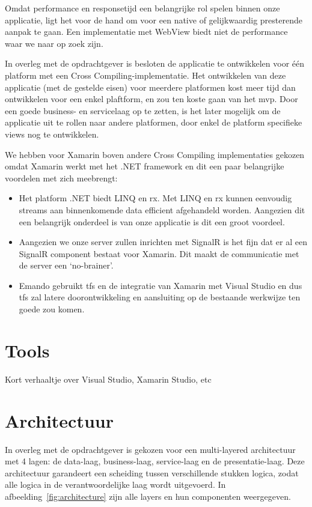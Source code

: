 Omdat performance en responsetijd een belangrijke rol spelen binnen onze applicatie, ligt het voor de hand om voor een native of gelijkwaardig presterende aanpak te gaan. Een implementatie met WebView biedt niet de performance waar we naar op zoek zijn.
    
In overleg met de opdrachtgever is besloten de applicatie te ontwikkelen voor \'e\'en platform met een Cross Compiling-implementatie. Het ontwikkelen van deze applicatie (met de gestelde eisen) voor meerdere platformen kost meer tijd dan ontwikkelen voor een enkel plaftform, en zou ten koste gaan van het \ac{mvp}. Door een goede business- en servicelaag op te zetten, is het later mogelijk om de applicatie uit te rollen naar andere platformen, door enkel de platform specifieke views nog te ontwikkelen.

We hebben voor Xamarin boven andere Cross Compiling implementaties gekozen omdat Xamarin werkt met het .NET framework en dit een paar belangrijke voordelen met zich meebrengt:

\begin{itemize}
    \item Het platform .NET biedt LINQ en \acf{rx}. Met LINQ en \ac{rx} kunnen eenvoudig streams aan binnenkomende data efficient afgehandeld worden. Aangezien dit een belangrijk onderdeel is van onze applicatie is dit een groot voordeel.
    \item Aangezien we onze server zullen inrichten met SignalR is het fijn dat er al een SignalR component bestaat voor Xamarin. Dit maakt de communicatie met de server een `no-brainer'.
    \item Emando gebruikt \acf{tfs} en de integratie van Xamarin met Visual Studio en dus \ac{tfs} zal latere doorontwikkeling en aansluiting op de bestaande werkwijze ten goede zou komen.
\end{itemize}

\section{Tools}
Kort verhaaltje over Visual Studio, Xamarin Studio, etc

\section{Architectuur}
In overleg met de opdrachtgever is gekozen voor een multi-layered architectuur met
4 lagen: de data-laag, business-laag, service-laag en de presentatie-laag. Deze 
architectuur garandeert een scheiding tussen verschillende stukken logica, zodat 
alle logica in de verantwoordelijke laag wordt uitgevoerd. In afbeelding~\ref{fig:architecture} zijn alle layers en hun componenten weergegeven.

